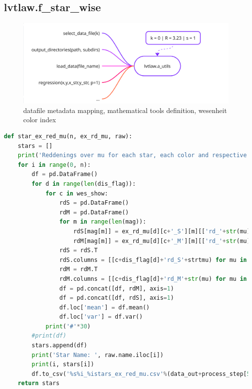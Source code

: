 \documentclass{article}
\begin{document}
\newpage
\subsection{lvtlaw.f\_star\_wise}

\begin{figure}[h!]
\caption{\small datafile metadata mapping, mathematical tools definition, wesenheit color index}
\includegraphics[width=\textwidth]{./figures/f_star_wise.png}
\end{figure}

\begin{lstlisting}[language=Python, caption=dependencies for main.py]
def star_ex_red_mu(n, ex_rd_mu, raw):
    stars = []
    print('Reddenings over mu for each star, each color and respective distance')
    for i in range(0, n):
        df = pd.DataFrame()
        for d in range(len(dis_flag)):
            for c in wes_show:
                rdS = pd.DataFrame()
                rdM = pd.DataFrame()
                for m in range(len(mag)):
                    rdS[mag[m]] = ex_rd_mu[d][c+'_S'][m][['rd_'+str(mu) for mu in del_mu]].iloc[i].values
                    rdM[mag[m]] = ex_rd_mu[d][c+'_M'][m][['rd_'+str(mu) for mu in del_mu]].iloc[i].values
                rdS = rdS.T
                rdS.columns = [[c+dis_flag[d]+'rd_S'+strtmu) for mu in del_mu]]  # Make sure number matches df.shape[1]
                rdM = rdM.T
                rdM.columns = [[c+dis_flag[d]+'rd_M'+str(mu) for mu in del_mu]]  # Make sure number matches df.shape[1]
                df = pd.concat([df, rdM], axis=1)                         
                df = pd.concat([df, rdS], axis=1)   
                df.loc['mean'] = df.mean()
                df.loc['var'] = df.var()                       
            print('#'*30)
        #print(df)
        stars.append(df)
        print('Star Name: ', raw.name.iloc[i])
        print(i, stars[i])                         
        df.to_csv('%s%i_%istars_ex_red_mu.csv'%(data_out+process_step[5],i, n))
    return stars
            
\end{lstlisting}
\end{document}
